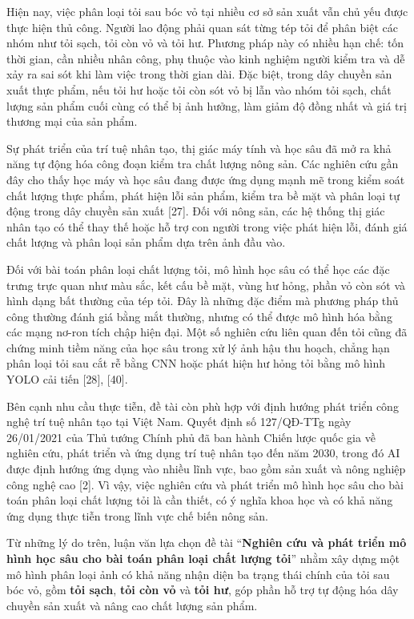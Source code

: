 \documentclass[
]{article}
\begin{document}
Hiện nay, việc phân loại tỏi sau bóc vỏ tại nhiều cơ sở sản xuất vẫn chủ
yếu được thực hiện thủ công. Người lao động phải quan sát từng tép tỏi
để phân biệt các nhóm như tỏi sạch, tỏi còn vỏ và tỏi hư. Phương pháp
này có nhiều hạn chế: tốn thời gian, cần nhiều nhân công, phụ thuộc vào
kinh nghiệm người kiểm tra và dễ xảy ra sai sót khi làm việc trong thời
gian dài. Đặc biệt, trong dây chuyền sản xuất thực phẩm, nếu tỏi hư hoặc
tỏi còn sót vỏ bị lẫn vào nhóm tỏi sạch, chất lượng sản phẩm cuối cùng
có thể bị ảnh hưởng, làm giảm độ đồng nhất và giá trị thương mại của sản
phẩm.

Sự phát triển của trí tuệ nhân tạo, thị giác máy tính và học sâu đã mở
ra khả năng tự động hóa công đoạn kiểm tra chất lượng nông sản. Các
nghiên cứu gần đây cho thấy học máy và học sâu đang được ứng dụng mạnh
mẽ trong kiểm soát chất lượng thực phẩm, phát hiện lỗi sản phẩm, kiểm
tra bề mặt và phân loại tự động trong dây chuyền sản xuất
{[}27{]}. Đối với nông sản,
các hệ thống thị giác nhân tạo có thể thay thế hoặc hỗ trợ con người
trong việc phát hiện lỗi, đánh giá chất lượng và phân loại sản phẩm dựa
trên ảnh đầu vào.

Đối với bài toán phân loại chất lượng tỏi, mô hình học sâu có thể học
các đặc trưng trực quan như màu sắc, kết cấu bề mặt, vùng hư hỏng, phần
vỏ còn sót và hình dạng bất thường của tép tỏi. Đây là những đặc điểm mà
phương pháp thủ công thường đánh giá bằng mắt thường, nhưng có thể được
mô hình hóa bằng các mạng nơ-ron tích chập hiện đại. Một số nghiên cứu
liên quan đến tỏi cũng đã chứng minh tiềm năng của học sâu trong xử lý
ảnh hậu thu hoạch, chẳng hạn phân loại tỏi sau cắt rễ bằng CNN hoặc phát
hiện hư hỏng tỏi bằng mô hình YOLO cải tiến {[}28{]}, {[}40{]}.

Bên cạnh nhu cầu thực tiễn, đề tài còn phù hợp với định hướng phát triển
công nghệ trí tuệ nhân tạo tại Việt Nam. Quyết định số 127/QĐ-TTg ngày
26/01/2021 của Thủ tướng Chính phủ đã ban hành Chiến lược quốc gia về
nghiên cứu, phát triển và ứng dụng trí tuệ nhân tạo đến năm 2030, trong
đó AI được định hướng ứng dụng vào nhiều lĩnh vực, bao gồm sản xuất và
nông nghiệp công nghệ cao
{[}2{]}.
Vì vậy, việc nghiên cứu và phát triển mô hình học sâu cho bài toán phân
loại chất lượng tỏi là cần thiết, có ý nghĩa khoa học và có khả năng ứng
dụng thực tiễn trong lĩnh vực chế biến nông sản.

Từ những lý do trên, luận văn lựa chọn đề tài ``\textbf{Nghiên cứu và
phát triển mô hình học sâu cho bài toán phân loại chất lượng tỏi}'' nhằm
xây dựng một mô hình phân loại ảnh có khả năng nhận diện ba trạng thái
chính của tỏi sau bóc vỏ, gồm \textbf{tỏi sạch}, \textbf{tỏi còn vỏ} và
\textbf{tỏi hư}, góp phần hỗ trợ tự động hóa dây chuyền sản xuất và nâng
cao chất lượng sản phẩm.
\end{document}
